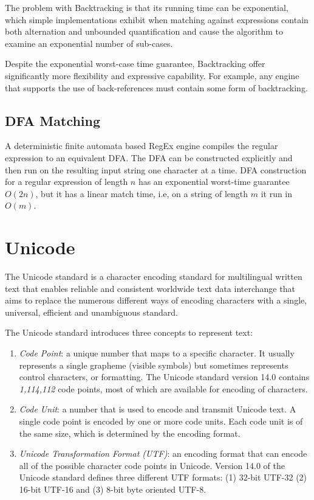 The problem with Backtracking is that its running time can be exponential, which simple implementations exhibit when matching against expressions contain both alternation and unbounded quantification and cause the algorithm to examine an exponential number of sub-cases.

Despite the exponential worst-case time guarantee, Backtracking offer significantly more flexibility and expressive capability. For example, any engine that supports the use of back-references must contain some form of backtracking.

\subsection{DFA Matching}

A deterministic finite automata based RegEx engine compiles the regular expression to an equivalent DFA. The DFA can be constructed explicitly and then run on the resulting input string one character at a time. DFA construction for a regular expression of length $n$ has an exponential worst-time guarantee $O(2n)$, but it has a linear match time, i.e, on a string of length $m$ it run in $O(m)$.


\section{Unicode}
The Unicode standard \cite{unicode} is a character encoding standard for multilingual written text that enables reliable and consistent worldwide text data interchange that aims to replace the numerous different ways of encoding characters with a single, universal, efficient and unambiguous standard.

The Unicode standard introduces three concepts to represent text:
\begin{enumerate}
    \item \textit{Code Point}: a unique number that maps to a specific character. It usually represents a single grapheme (visible symbols) but sometimes represents control characters, or formatting. The Unicode standard version 14.0 contains \textit{1,114,112} code points, most of which are available for encoding of characters.
    
    \item \textit{Code Unit}: a number that is used to encode and transmit Unicode text. A single code point is encoded by one or more code units. Each code unit is of the same size, which is determined by the encoding format.
    
    \item \textit{Unicode Transformation Format (UTF)}: an encoding format that can encode all of the possible character code points in Unicode. Version 14.0 of the Unicode standard defines three different UTF formats: (1) 32-bit UTF-32 (2) 16-bit UTF-16 and (3) 8-bit byte oriented UTF-8.
\end{enumerate}

